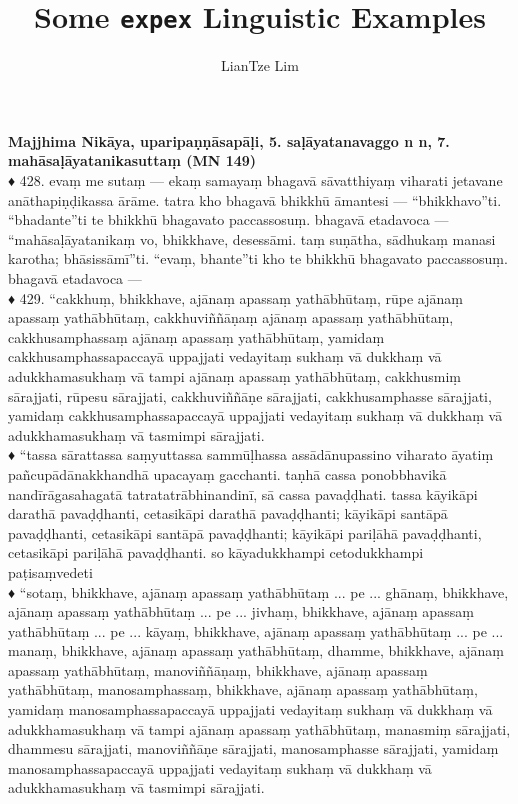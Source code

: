 \documentclass[11pt]{article}
\title{Some \texttt{expex} Linguistic Examples}
\author{LianTze Lim}
\begin{document}
\textbf{Majjhima Nikāya, uparipaṇṇāsapāḷi, 5. saḷāyatanavaggo n n, 7. mahāsaḷāyatanikasuttaṃ (MN 149)}\\[.3cm]

♦ 428. evaṃ me sutaṃ — ekaṃ samayaṃ bhagavā sāvatthiyaṃ viharati jetavane anāthapiṇḍikassa ārāme. tatra kho bhagavā bhikkhū āmantesi — “bhikkhavo”ti. “bhadante”ti te bhikkhū bhagavato paccassosuṃ. bhagavā etadavoca — “mahāsaḷāyatanikaṃ vo, bhikkhave, desessāmi. taṃ suṇātha, sādhukaṃ manasi karotha; bhāsissāmī”ti. “evaṃ, bhante”ti kho te bhikkhū bhagavato paccassosuṃ. bhagavā etadavoca —\\

♦ 429. “cakkhuṃ, bhikkhave, ajānaṃ apassaṃ yathābhūtaṃ, rūpe ajānaṃ apassaṃ yathābhūtaṃ, cakkhuviññāṇaṃ ajānaṃ apassaṃ yathābhūtaṃ, cakkhusamphassaṃ ajānaṃ apassaṃ yathābhūtaṃ, yamidaṃ cakkhusamphassapaccayā uppajjati vedayitaṃ sukhaṃ vā dukkhaṃ vā adukkhamasukhaṃ vā tampi ajānaṃ apassaṃ yathābhūtaṃ, cakkhusmiṃ sārajjati, rūpesu sārajjati, cakkhuviññāṇe sārajjati, cakkhusamphasse sārajjati, yamidaṃ cakkhusamphassapaccayā uppajjati vedayitaṃ sukhaṃ vā dukkhaṃ vā adukkhamasukhaṃ vā tasmimpi sārajjati.\\

♦ “tassa sārattassa saṃyuttassa sammūḷhassa assādānupassino viharato āyatiṃ pañcupādānakkhandhā upacayaṃ gacchanti. taṇhā cassa ponobbhavikā nandīrāgasahagatā tatratatrābhinandinī, sā cassa pavaḍḍhati. tassa kāyikāpi darathā pavaḍḍhanti, cetasikāpi darathā pavaḍḍhanti; kāyikāpi santāpā pavaḍḍhanti, cetasikāpi santāpā pavaḍḍhanti; kāyikāpi pariḷāhā pavaḍḍhanti, cetasikāpi pariḷāhā pavaḍḍhanti. so kāyadukkhampi cetodukkhampi paṭisaṃvedeti\\
♦ “sotaṃ, bhikkhave, ajānaṃ apassaṃ yathābhūtaṃ ... pe ... ghānaṃ, bhikkhave, ajānaṃ apassaṃ yathābhūtaṃ ... pe ... jivhaṃ, bhikkhave, ajānaṃ apassaṃ yathābhūtaṃ ... pe ... kāyaṃ, bhikkhave, ajānaṃ apassaṃ yathābhūtaṃ ... pe ... manaṃ, bhikkhave, ajānaṃ apassaṃ yathābhūtaṃ, dhamme, bhikkhave, ajānaṃ apassaṃ yathābhūtaṃ, manoviññāṇaṃ, bhikkhave, ajānaṃ apassaṃ yathābhūtaṃ, manosamphassaṃ, bhikkhave, ajānaṃ apassaṃ yathābhūtaṃ, yamidaṃ manosamphassapaccayā uppajjati vedayitaṃ sukhaṃ vā dukkhaṃ vā adukkhamasukhaṃ vā tampi ajānaṃ apassaṃ yathābhūtaṃ, manasmiṃ sārajjati, dhammesu sārajjati, manoviññāṇe sārajjati, manosamphasse sārajjati, yamidaṃ manosamphassapaccayā uppajjati vedayitaṃ sukhaṃ vā dukkhaṃ vā adukkhamasukhaṃ vā tasmimpi sārajjati.\\
\end{document}

